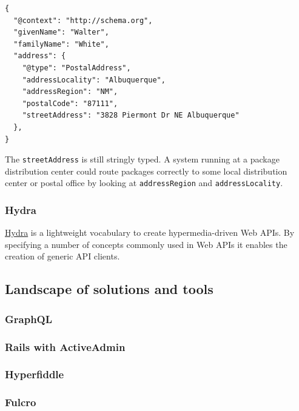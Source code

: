 \lstset{language=JSON}
\begin{lstlisting}[caption=A person with an address of type PostalAddress]
{
  "@context": "http://schema.org",
  "givenName": "Walter",
  "familyName": "White",
  "address": {
    "@type": "PostalAddress",
    "addressLocality": "Albuquerque",
    "addressRegion": "NM",
    "postalCode": "87111",
    "streetAddress": "3828 Piermont Dr NE Albuquerque"
  },
}
\end{lstlisting}

The \lstinline{streetAddress} is still stringly typed. A system running at a package distribution center could route packages correctly to some local distribution center or postal office by looking at \lstinline{addressRegion} and \lstinline{addressLocality}.

\subsubsection{Hydra}

\href{http://www.hydra-cg.com/}{Hydra} is a lightweight vocabulary to create hypermedia-driven Web APIs. By specifying a number of concepts commonly used in Web APIs it enables the creation of generic API clients.\citep{hydasprecs}

\subsection{Landscape of solutions and tools}

\subsubsection{GraphQL}
\subsubsection{Rails with ActiveAdmin}
\subsubsection{Hyperfiddle}
\subsubsection{Fulcro}
